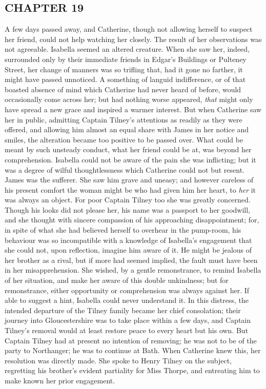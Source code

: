 \subsection[chapter-19]{\useURL[url21][][][]\from[url21]CHAPTER 19}

A few days passed away, and Catherine, though not allowing herself to suspect her friend, could not help watching her closely. The result of her observations was not agreeable. Isabella seemed an altered creature. When she saw her, indeed, surrounded only by their immediate friends in Edgar's Buildings or Pulteney Street, her change of manners was so trifling that, had it gone no farther, it might have passed unnoticed. A something of languid indifference, or of that boasted absence of mind which Catherine had never heard of before, would occasionally come across her; but had nothing worse appeared, {\em that} might only have spread a new grace and inspired a warmer interest. But when Catherine saw her in public, admitting Captain Tilney's attentions as readily as they were offered, and allowing him almost an equal share with James in her notice and smiles, the alteration became too positive to be passed over. What could be meant by such unsteady conduct, what her friend could be at, was beyond her comprehension. Isabella could not be aware of the pain she was inflicting; but it was a degree of wilful thoughtlessness which Catherine could not but resent. James was the sufferer. She saw him grave and uneasy; and however careless of his present comfort the woman might be who had given him her heart, to {\em her} it was always an object. For poor Captain Tilney too she was greatly concerned. Though his looks did not please her, his name was a passport to her goodwill, and she thought with sincere compassion of his approaching disappointment; for, in spite of what she had believed herself to overhear in the pump-room, his behaviour was so incompatible with a knowledge of Isabella's engagement that she could not, upon reflection, imagine him aware of it. He might be jealous of her brother as a rival, but if more had seemed implied, the fault must have been in her misapprehension. She wished, by a gentle remonstrance, to remind Isabella of her situation, and make her aware of this double unkindness; but for remonstrance, either opportunity or comprehension was always against her. If able to suggest a hint, Isabella could never understand it. In this distress, the intended departure of the Tilney family became her chief consolation; their journey into Gloucestershire was to take place within a few days, and Captain Tilney's removal would at least restore peace to every heart but his own. But Captain Tilney had at present no intention of removing; he was not to be of the party to Northanger; he was to continue at Bath. When Catherine knew this, her resolution was directly made. She spoke to Henry Tilney on the subject, regretting his brother's evident partiality for Miss Thorpe, and entreating him to make known her prior engagement.


